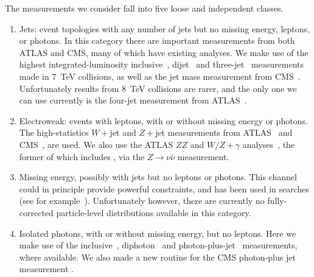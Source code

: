 \documentclass[floatfix]{article}
\begin{document}
The measurements we consider fall into five loose and independent classes.
\begin{enumerate}
\item
Jets: event topologies with any number of jets but no missing energy, leptons, or photons. In this category there
are important measurements from both ATLAS and CMS, many of which have existing \rivet analyses. We make use of 
the highest integrated-luminosity inclusive~\cite{Aad:2014vwa,Chatrchyan:2014gia}, dijet~\cite{Aad:2013tea,Aad:2014pua} 
and three-jet~\cite{Aad:2014rma} 
measurements made in 7~TeV collisions, as well as the jet mass 
measurement from CMS~\cite{Chatrchyan:2013vbb}.
Unfortunately results from 8~TeV collisions are rarer, and the only one we can use currently is the four-jet 
measurement from ATLAS~\cite{Aad:2015nda}.
\item
Electroweak: events with leptons, with or without missing energy or photons. The high-statistics $W+$jet and $Z+$jet measurements 
from ATLAS~\cite{Aad:2014qxa,Aad:2013ysa} 
and CMS~\cite{Khachatryan:2014uva,Khachatryan:2014zya}, are used.
We also use the ATLAS $ZZ$ and $W/Z+\gamma$ analyses~\cite{Aad:2012awa,Aad:2013izg}, the former of which includes \MET, 
via the $Z \rightarrow \nu\bar{\nu}$ measurement.
\item
Missing energy, possibly with jets but no leptons or photons. This channel could in principle provide powerful constraints, and has been 
used in searches (see for example~\cite{Aad:2012fqa}). Unfortunately however, there are currently no fully-corrected particle-level 
distributions available in this category. 
\item
Isolated photons, with or without missing energy, but no leptons. Here we make use of the inclusive~\cite{Aad:2013zba}, diphoton~\cite{Aad:2012tba} and 
photon-plus-jet~\cite{ATLAS:2012ar} measurements,
where available. We also made a new \rivet routine for the CMS photon-plus jet measurement \cite{Chatrchyan:2013mwa}. 

\end{enumerate}
\end{document}
